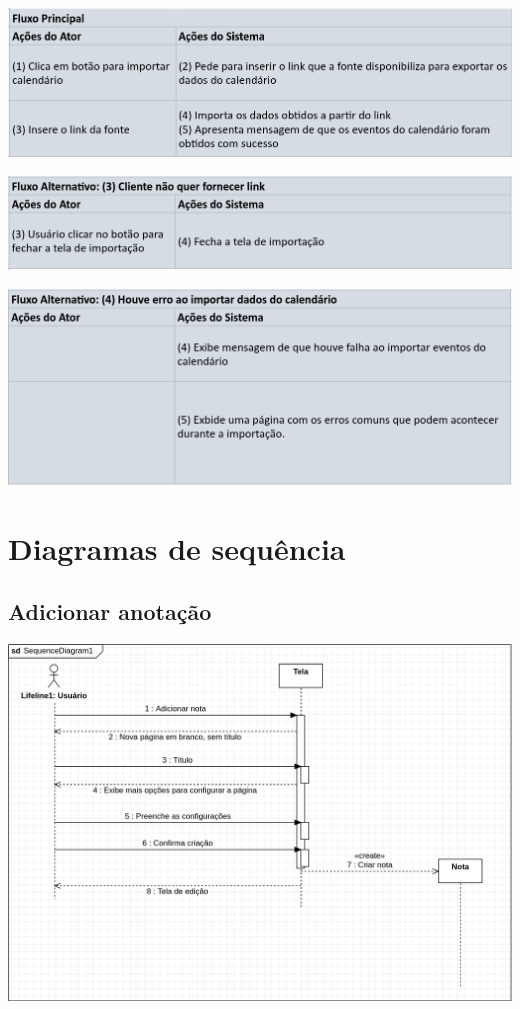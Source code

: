 \documentclass[
	12pt,				%
	openright,			%
	oneside,			    %
	a4paper,				%
	english,			%
	french,			%
	spanish,			%
	brazil			%
	]{abntex2}
\begin{document}
\includegraphics[scale=0.4]{Imagens/UC2-FP.png}

\includegraphics[scale=0.4]{Imagens/UC2-FA1.png}

\includegraphics[scale=0.4]{Imagens/UC2-FA2.png}




\section{Diagramas de sequência}
\subsection{Adicionar anotação}
\includegraphics[scale=0.4]{Imagens/UC1-SEQ.png}
\end{document}
